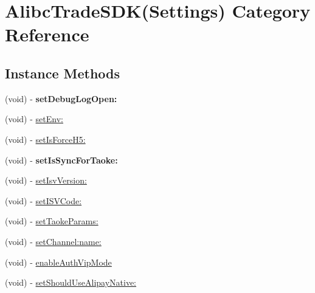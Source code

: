 \hypertarget{category_alibc_trade_s_d_k_07_settings_08}{}\section{Alibc\+Trade\+S\+DK(Settings) Category Reference}
\label{category_alibc_trade_s_d_k_07_settings_08}
\subsection*{Instance Methods}
\begin{DoxyCompactItemize}
\item 
\mbox{\label{category_alibc_trade_s_d_k_07_settings_08_a576e2e7c36d64eb0567e02e6ae88b927}} 
(void) -\/ {\bfseries set\+Debug\+Log\+Open\+:}
\item 
(void) -\/ \mbox{\hyperlink{category_alibc_trade_s_d_k_07_settings_08_a08d8381b1c9bef18ff5ee50ced4747b4}{set\+Env\+:}}
\item 
(void) -\/ \mbox{\hyperlink{category_alibc_trade_s_d_k_07_settings_08_aa0905a77885d33d44762a552acdcef2d}{set\+Is\+Force\+H5\+:}}
\item 
\mbox{\label{category_alibc_trade_s_d_k_07_settings_08_a063034f81c715415adb27a37cde8480c}} 
(void) -\/ {\bfseries set\+Is\+Sync\+For\+Taoke\+:}
\item 
(void) -\/ \mbox{\hyperlink{category_alibc_trade_s_d_k_07_settings_08_aaf25692948a3bcad5f2099789c92b5c8}{set\+Isv\+Version\+:}}
\item 
(void) -\/ \mbox{\hyperlink{category_alibc_trade_s_d_k_07_settings_08_a9e2f6b18663323c17cdcfa8fc42e0c32}{set\+I\+S\+V\+Code\+:}}
\item 
(void) -\/ \mbox{\hyperlink{category_alibc_trade_s_d_k_07_settings_08_aa6e5c46a89ab3539e6d95b827d31bae5}{set\+Taoke\+Params\+:}}
\item 
(void) -\/ \mbox{\hyperlink{category_alibc_trade_s_d_k_07_settings_08_ab52eb7ebf4462b6f44f3441df9c75e03}{set\+Channel\+:name\+:}}
\item 
(void) -\/ \mbox{\hyperlink{category_alibc_trade_s_d_k_07_settings_08_a3d359fcee90883874d9f95757ef069c8}{enable\+Auth\+Vip\+Mode}}
\item 
(void) -\/ \mbox{\hyperlink{category_alibc_trade_s_d_k_07_settings_08_aacfcf26210f84b53ce09dd44e68dd91a}{set\+Should\+Use\+Alipay\+Native\+:}}
\end{DoxyCompactItemize}


